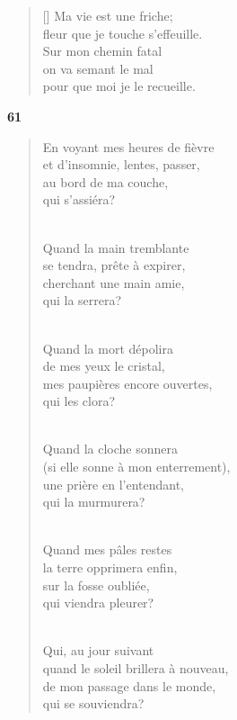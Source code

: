\documentclass[a4paper,12pt]{book}
\begin{document}
\begin{verse}[\versewidth]
  Ma vie est une friche; \\
  fleur que je touche s'effeuille. \\
  Sur mon chemin fatal \\
  on va semant le mal \\
  pour que moi je le recueille.
\end{verse}

\bigskip

\begin{center}
  \textbf{61}
   \end{center}

\begin{verse}
En voyant mes heures de fièvre \\
et d'insomnie, lentes, passer, \\
au bord de ma couche, \\
qui s'assiéra? \\ \

Quand la main tremblante \\
se tendra, prête à expirer, \\
cherchant une main amie, \\
qui la serrera? \\ \


Quand la mort dépolira \\
de mes yeux le cristal, \\
mes paupières encore ouvertes, \\
qui les clora? \\ \

Quand la cloche sonnera \\
(si elle sonne à mon enterrement), \\
une prière en l'entendant, \\
qui la murmurera? \\ \

Quand mes pâles restes \\
la terre opprimera enfin, \\
sur la fosse oubliée, \\
qui viendra pleurer? \\ \

Qui, au jour suivant \\
quand le soleil brillera à nouveau, \\
de mon passage dans le monde, \\
qui se souviendra? \\
\end{verse}
\end{document}

